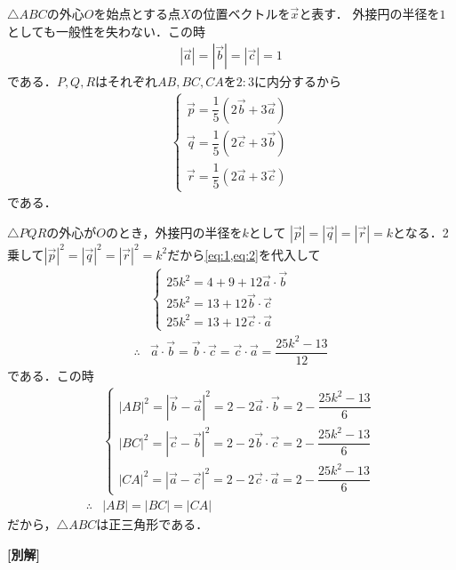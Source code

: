 \documentclass[../../main.tex]{subfiles}
\begin{document}
$\triangle ABC$の外心$O$を始点とする点$X$の位置ベクトルを$\vec{x}$と表す．
外接円の半径を$1$としても一般性を失わない．この時
\begin{align}
  |\vec{a}|=|\vec{b}|=|\vec{c}|=1 \label{eq:1}
\end{align}
である．$P,Q,R$はそれぞれ$AB,BC,CA$を$2:3$に内分するから
\begin{align}
  \begin{cases}
    \vec{p}=\dfrac{1}{5}(2\vec{b}+3\vec{a}) \\
    \vec{q}=\dfrac{1}{5}(2\vec{c}+3\vec{b}) \\
    \vec{r}=\dfrac{1}{5}(2\vec{a}+3\vec{c})
  \end{cases} \label{eq:2}
\end{align}
である．

$\triangle PQR$の外心が$O$のとき，外接円の半径を$k$として $|\vec{p}|=|\vec{q}|=|\vec{r}|=k$となる．2乗して$|\vec{p}|^2=|\vec{q}|^2=|\vec{r}|^2=k^2$だから\cref{eq:1,eq:2}を代入して
\begin{align}
  &
  \begin{cases}
    25k^2=4+9+12\vec{a}\cdot\vec{b} \\
    25k^2=13+12\vec{b}\cdot\vec{c} \\
    25k^2=13+12\vec{c}\cdot\vec{a}
  \end{cases} \\
  \therefore
  & \vec{a}\cdot\vec{b}=\vec{b}\cdot\vec{c}=\vec{c}\cdot\vec{a}=\dfrac{25k^2-13}{12}
  \label{eq:3}
\end{align}
である．この時
\begin{align}
  &
  \begin{cases}
    |AB|^2 = |\vec{b}-\vec{a}|^2 = 2 - 2\vec{a}\cdot\vec{b} = 2 - \dfrac{25k^2-13}{6} \\
    |BC|^2 = |\vec{c}-\vec{b}|^2 = 2 - 2\vec{b}\cdot\vec{c} = 2 - \dfrac{25k^2-13}{6} \\
    |CA|^2 = |\vec{a}-\vec{c}|^2 = 2 - 2\vec{c}\cdot\vec{a} = 2 - \dfrac{25k^2-13}{6}
  \end{cases} \\
  \therefore
  & |AB|=|BC|=|CA|
\end{align}
だから，$\triangle ABC$は正三角形である．

{\bf [別解]}
\end{document}
